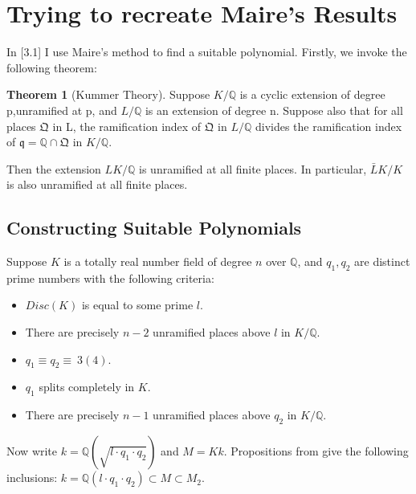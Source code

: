\documentclass[12pt]{extarticle}
\newcommand{\Q}{\mathbb{Q}}
\newcommand{\<}{\langle}
\renewcommand{\>}{\rangle}
\theoremstyle{definition}
\newtheorem{theorem}{Theorem}
\begin{document}
\section{Trying to recreate Maire's Results}
In \cite{MAIR}[3.1] I use Maire's method to find a suitable polynomial.
Firstly, we invoke the following theorem:
\begin{theorem}[Kummer Theory]
Suppose $K/\mathbb{Q}$ is a cyclic extension of degree p,unramified at p, and $L/\mathbb{Q}$ is an extension of degree n. Suppose also that for all places $\mathfrak{Q}$ in L, the ramification index of $\mathfrak{Q}$ in $L/\mathbb{Q}$ divides the ramification index of $\mathfrak{q} = \mathbb{Q}\cap\mathfrak{Q}$ in $K/\mathbb{Q}$. \par
Then the extension $LK/\mathbb{Q}$ is unramified at all finite places. In particular, $\bar{L}K/K$ is also unramified at all finite places.
\end{theorem}
\subsection{Constructing Suitable Polynomials}
Suppose $K$ is a totally real number field of degree $n$ over $\Q$, and $q_1,q_2$ are distinct prime numbers with the following criteria:
\begin{itemize}
\item $Disc(K)$ is equal to some prime $l$.
\item There are precisely $n-2$ unramified places above $l$ in $K/\Q$. 
\item $q_1 \equiv q_2 \equiv \: 3 (4)$.
\item $q_1$ splits completely in $K$.
\item There are precisely $n-1$ unramified places above $q_2$ in $K/\Q$. 
\end{itemize}
Now write $k=\Q(\sqrt{l \cdot q_1 \cdot q_2})$ and $M=Kk$. 
Propositions from \cite{MAIR} give the following inclusions: 
$k = \Q(l \cdot q_1 \cdot q_2) \subset M \subset M_2$.
\end{document}
